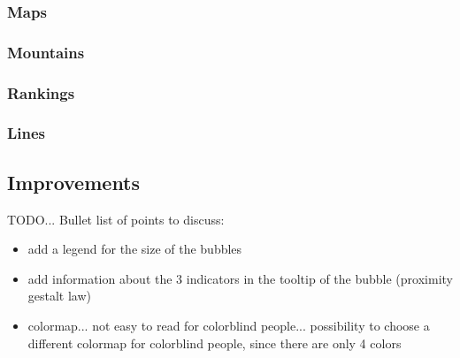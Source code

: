 \subsubsection{Maps}

\subsubsection{Mountains}

\subsubsection{Rankings}

\subsubsection{Lines}


\subsection{Improvements}
TODO...
Bullet list of points to discuss:
\begin{itemize}
    \item add a legend for the size of the bubbles
    \item add information about the 3 indicators in the tooltip of the bubble (proximity gestalt law)

    \item colormap... not easy to read for colorblind people... possibility to choose a different colormap for colorblind people, since there are only 4 colors
\end{itemize}
